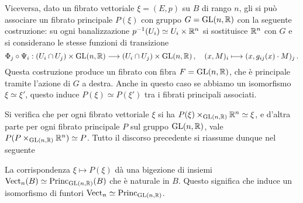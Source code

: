 Viceversa, dato un fibrato vettoriale $\xi = (E,p)$ su $B$ di rango $n$,
gli si può associare un fibrato principale $P(\xi)$ con gruppo $G=\mathrm{GL}(n,{\mathbb R})$
con la seguente costruzione: su ogni banalizzazione $p^{-1}(U_{i}) \simeq U_{i} \times {\mathbb R}^{n}$
si sostituisce ${\mathbb R}^{n}$ con $G$ e si considerano le stesse funzioni di transizione
\begin{equation*}
	\Phi_{j} \circ \Psi_{i} : (U_{i} \cap U_{j}) \times \mathrm{GL}(n,{\mathbb R}) 
	\longrightarrow (U_{i} \cap U_{j}) \times \mathrm{GL}(n,{\mathbb R})\,,
	\quad (x,M)_{i} \longmapsto (x, g_{ij}(x) \cdot M)_{j}\,.
\end{equation*}
Questa costruzione produce un fibrato con fibra $F=\mathrm{GL}(n,{\mathbb R})$,
che è principale tramite l'azione di $G$ a destra.
Anche in questo caso se abbiamo un isomorfismo $\xi \simeq \xi'$,
questo induce $P(\xi) \simeq P(\xi')$ tra i fibrati principali associati.

Si verifica che per ogni fibrato vettoriale $\xi$ si ha 
$P(\xi) \times_{\mathrm{GL}(n,{\mathbb R})} {\mathbb R}^{n} \simeq \xi$,
e d'altra parte per ogni fibrato principale $P$ sul gruppo $\mathrm{GL}(n,{\mathbb R})$,
vale $P(P \times_{\mathrm{GL}(n,{\mathbb R})} {\mathbb R}^{n}) \simeq P$. 
Tutto il discorso precedente si riassume dunque nel seguente

\begin{thm}
	La corrispondenza $\xi \mapsto P(\xi)$ dà una bigezione di insiemi %
	$\mathrm{Vect}_{n}(B) \simeq \mathrm{Princ}_{\mathrm{GL}(n,{\mathbb R})}(B)$ che è naturale in $B$.
	Questo significa che induce un isomorfismo di funtori 
	$\mathrm{Vect}_{n} \simeq \mathrm{Princ}_{\mathrm{GL}(n,{\mathbb R})}$.
\end{thm}















